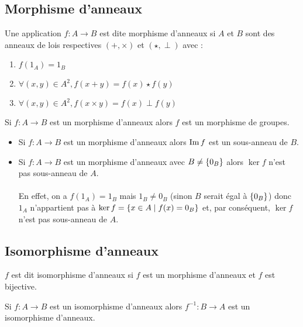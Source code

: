 \subsection{Morphisme d’anneaux}
\begin{defi}
    Une application \(f : A \to B\) est dite morphisme d’anneaux si \(A\) et \(B\) sont des anneaux de lois respectives \((+, \times)\) et \((\star, \perp)\) avec :
    \begin{enumerate}
        \item \(f (1_A) = 1_B\) 
        \item \(\forall (x, y) \in A^2, f (x + y) = f (x) \star f (y)\)
        \item \(\forall (x, y) \in A^2, f (x \times y) = f (x)\perp f(y)\)
    \end{enumerate}
\end{defi}

\begin{prop}
    Si \(f : A \to B\) est un morphisme d’anneaux alors \(f\) est un morphisme de groupes.
\end{prop}

\begin{defprop}
    \begin{itemize}
        \item Si \(f : A \to B\) est un morphisme d’anneaux alors \(\operatorname{Im} f\) est un sous-anneau de \(B\).
        \item Si \(f : A \to B\) est un morphisme d’anneaux avec \(B\neq \left\lbrace0_B \right\rbrace\) alors \(\ker f\) n’est pas sous-anneau de \(A\).\\~\\
            En effet, on a \(f (1_A) = 1_B\) mais \(1_B\neq 0_B\) (sinon \(B\) serait égal à \(\left\lbrace0_B \right\rbrace\)) donc \(1_A\) n’appartient pas à \(\ker f = \left\lbrace x \in A \;\middle|\; f (x) = 0_B \right\rbrace\) et, par conséquent, \(\ker f\) n’est pas sous-anneau de \(A\).
    \end{itemize}
\end{defprop}

\subsection{Isomorphisme d’anneaux}
\begin{defi}
    \(f\) est dit isomorphisme d’anneaux si \(f\) est un morphisme d’anneaux et \(f\) est bijective.
\end{defi}

\begin{prop}
    Si \(f : A \to B\) est un isomorphisme d’anneaux alors \(f^{-1} : B \to A\) est un isomorphisme d’anneaux.
\end{prop}

